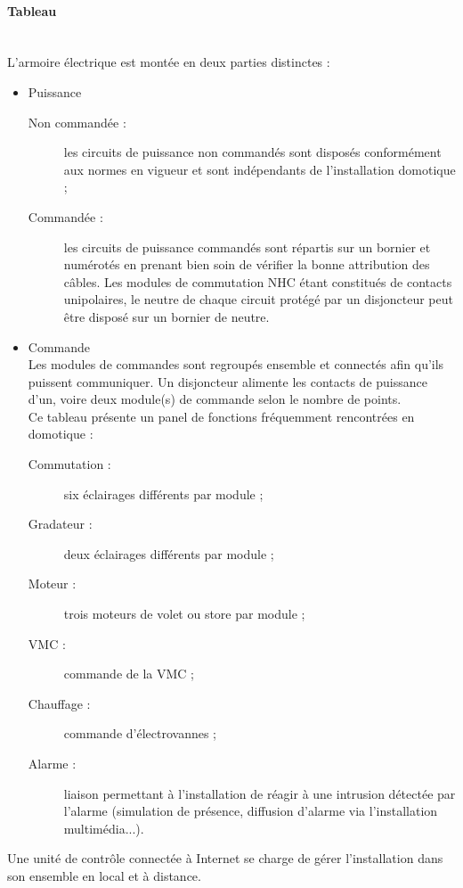 \documentclass[a4paper, 12pt]{article}
\begin{document}
\paragraph{Tableau}
~\\
L’armoire électrique est montée en deux parties distinctes :
\begin{itemize} 
  \item Puissance
  \begin{description} 
  \item[Non commandée :] les circuits de puissance non commandés sont disposés conformément aux normes en vigueur et sont indépendants de l’installation domotique ;
  \item[Commandée :] les circuits de puissance commandés sont répartis sur un bornier et numérotés en prenant bien soin de vérifier la bonne attribution des câbles. Les modules de commutation NHC étant constitués de contacts unipolaires, le neutre de chaque circuit protégé par un disjoncteur peut être disposé sur un bornier de neutre.
\end{description} 

\item Commande\\
Les modules de commandes sont regroupés ensemble et connectés afin qu’ils puissent communiquer. Un disjoncteur alimente les contacts de puissance d’un, voire deux module(s) de commande selon le nombre de points.\\Ce tableau présente un panel de fonctions fréquemment rencontrées en domotique :
\begin{description} 
  \item[Commutation :] six éclairages différents par module ;
  \item[Gradateur :]  deux éclairages différents par module ;
  \item[Moteur :] trois moteurs de volet ou store par module ;
  \item[VMC :] commande de la VMC ;
  \item[Chauffage :] commande d'électrovannes ;
  \item[Alarme :] liaison permettant à l’installation de réagir à une intrusion détectée par l’alarme (simulation de présence, diffusion d'alarme via l'installation multimédia...).
\end{description} 
\end{itemize}

Une unité de contrôle connectée à Internet se charge de gérer l’installation dans son
ensemble en local et à distance.
\end{document}
